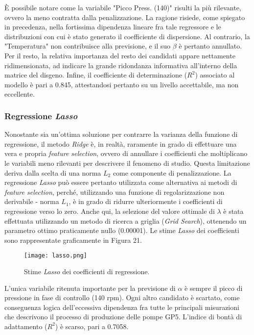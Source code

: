 \documentclass[fleqn,10pt]{SelfArx} %
\begin{document}
È possibile notare come la variabile "Picco Press. (140)" risulti la più rilevante, ovvero la meno contratta dalla penalizzazione. La ragione risiede, come spiegato in precedenza, nella fortissima dipendenza lineare fra tale regressore e le distribuzioni con cui è stato generato il coefficiente di dispersione. Al contrario, la "Temperatura" non contribuisce alla previsione, e il suo $\beta$ è pertanto annullato. Per il resto, la relativa importanza del resto dei candidati appare nettamente ridimensionata, ad indicare la grande ridondanza informativa all'interno della matrice del disgeno. Infine, il coefficiente di determinazione ($R^2$) associato al modello è pari a 0.845, attestandosi pertanto su un livello accettabile, ma non eccellente.
\subsubsection{Regressione \textit{Lasso}}
Nonostante sia un'ottima soluzione per contrarre la varianza della funzione di regressione, il metodo \textit{Ridge} è, in realtà, raramente in grado di effettuare una vera e propria \textit{feature selection}, ovvero di annullare i coefficienti che moltiplicano le variabili meno rilevanti per descrivere il fenomeno di studio. Questa limitazione deriva dalla scelta di una norma $L_2$ come componente di penalizzazione. La regressione \textit{Lasso} \cite{Lasso} può essere pertanto utilizzata come alternativa ai metodi di \textit{feature selection}, perché, utilizzando una funzione di regolarizzazione non derivabile - norma $L_1$, è in grado di ridurre ulteriormente i coefficienti di regressione verso lo zero. Anche qui, la selezione del valore ottimale di $\lambda$ è stata effettuata utilizzando un metodo di ricerca a griglia (\textit{Grid Search}), ottenendo un parametro ottimo praticamente nullo (0.00001). Le stime \textit{Lasso} dei coefficienti sono rappresentate graficamente in Figura 21.
\begin{figure}[h]
    \centering
    \texttt{[image: lasso.png]}
    \label{fig:em}
    \caption{Stime \textit{Lasso} dei coefficienti di regressione.}
\end{figure}
L'unica variabile ritenuta importante per la previsione di $\alpha$ è sempre il picco di pressione in fase di controllo (140 rpm). Ogni altro candidato è scartato, come conseguenza logica dell'eccessiva dipendenza fra tutte le principali misurazioni che descrivono il processo di produzione delle pompe GP5. L'indice di bontà di adattamento ($R^2$) è scarso, pari a 0.7058.
\end{document}
